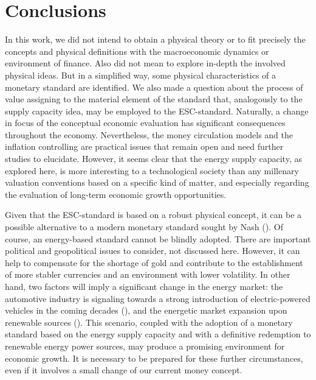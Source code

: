 \documentclass[11pt]{article}
\begin{document}
\section{Conclusions}\label{conclusions}

In this work, we did not intend to obtain a physical theory or to fit precisely the concepts and physical definitions with the 
macroeconomic dynamics or environment of finance. Also did not mean to explore in-depth the involved physical ideas. But in a simplified 
way, some physical characteristics of a monetary standard are identified. We also made a question about the process of value assigning to 
the material element of the standard that, analogously to the supply capacity idea, may be employed to the ESC-standard. 
Naturally, a change in focus of the conceptual economic evaluation has significant consequences throughout the economy. Nevertheless, 
the money circulation models and the inflation controlling are practical issues that remain open and need further studies to elucidate. 
However, it seems clear that the energy supply capacity, as explored here, is more interesting to a technological society than any millenary 
valuation conventions based on a specific kind of matter, and especially regarding the evaluation of long-term economic growth 
opportunities.

Given that the ESC-standard is based on a robust physical concept, it can be a possible alternative to a modern monetary standard sought by 
Nash (\citealp[p.7]{Nash2002}). Of course, an energy-based standard cannot be blindly adopted. There are important  political and 
geopolitical issues to consider, not discussed here. However, it can help to compensate for the shortage of gold and contribute to the 
establishment of more stabler currencies and an environment with lower volatility. In other hand, two factors will imply a significant 
change in the energy market: the automotive industry is signaling towards a strong introduction of electric-powered vehicles in the coming 
decades (\citealt{EV2017}), and the energetic market expansion upon renewable sources (\citealt{RES2017}). This scenario, coupled with the 
adoption of a monetary standard based on the energy supply capacity and with a definitive redemption to renewable energy power sources, may 
produce a promising environment for economic growth. It is necessary to be prepared for these further circumstances, even if it involves a 
small change of our current money concept.
\\




\begin{doublespacing}   %


\end{doublespacing}


\renewcommand{\enotesize}{\normalsize}
\end{document}
